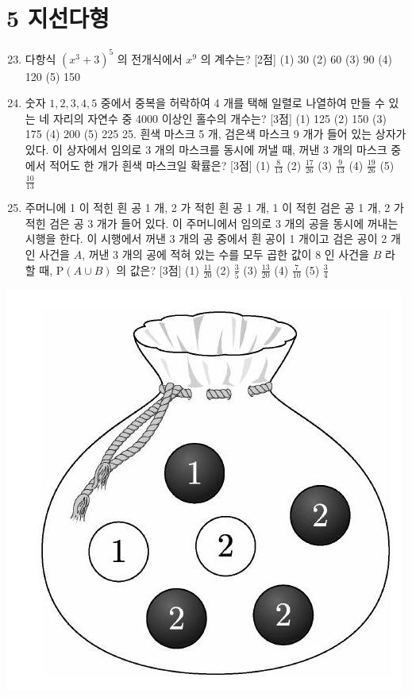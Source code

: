 \documentclass[10pt]{article}
\begin{document}
\section{5 지선다형}
\begin{enumerate}
  \setcounter{enumi}{22}
  \item 다항식 $\left(x^{3}+3\right)^{5}$ 의 전개식에서 $x^{9}$ 의 계수는? [2점]
(1) 30
(2) 60
(3) 90
(4) 120
(5) 150

  \item 숫자 $1,2,3,4,5$ 중에서 중복을 허락하여 4 개를 택해 일렬로 나열하여 만들 수 있는 네 자리의 자연수 중 4000 이상인 홀수의 개수는? [3점]
(1) 125
(2) 150
(3) 175
(4) 200
(5) 225 25. 흰색 마스크 5 개, 검은색 마스크 9 개가 들어 있는 상자가 있다. 이 상자에서 임의로 3 개의 마스크를 동시에 꺼낼 때, 꺼낸 3 개의 마스크 중에서 적어도 한 개가 흰색 마스크일 확률은? [3점]
(1) $\frac{8}{13}$
(2) $\frac{17}{26}$
(3) $\frac{9}{13}$
(4) $\frac{19}{26}$
(5) $\frac{10}{13}$

  \item 주머니에 1 이 적힌 흰 공 1 개, 2 가 적힌 흰 공 1 개, 1 이 적힌 검은 공 1 개, 2 가 적힌 검은 공 3 개가 들어 있다. 이 주머니에서 임의로 3 개의 공을 동시에 꺼내는 시행을 한다. 이 시행에서 꺼낸 3 개의 공 중에서 흰 공이 1 개이고 검은 공이 2 개인 사건을 $A$, 꺼낸 3 개의 공에 적혀 있는 수를 모두 곱한 값이 8 인 사건을 $B$ 라 할 때, $\mathrm{P}(A \cup B)$ 의 값은? [3점]
(1) $\frac{11}{20}$
(2) $\frac{3}{5}$
(3) $\frac{13}{20}$
(4) $\frac{7}{10}$
(5) $\frac{3}{4}$

\end{enumerate}

\begin{center}
\includegraphics[max width=\textwidth]{2023_05_19_a9cef858603f6abf5411g-30}
\end{center}
\end{document}
